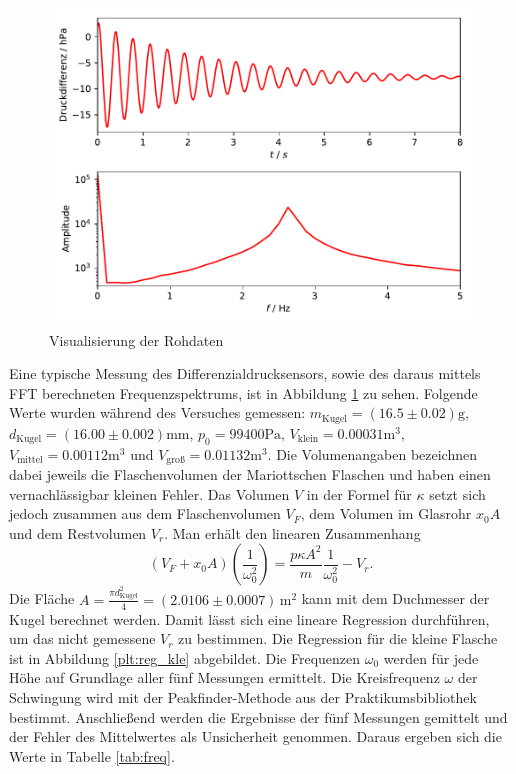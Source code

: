 \documentclass[a4paper, 12pt]{scrartcl}
\begin{document}
\begin{figure}[H]
\centering
\includegraphics[width=\textwidth]{plots/rohdaten_log.pdf}
\caption{Visualisierung der Rohdaten}
\label{rohdaten}
\end{figure}
Eine typische Messung des Differenzialdrucksensors, sowie des daraus mittels FFT berechneten Frequenzspektrums, ist in Abbildung \ref{rohdaten} zu sehen.
Folgende Werte wurden während des Versuches gemessen: $m_{\text{Kugel}} = (16.5\pm 0.02)\text{g}$, $d_{\text{Kugel}} = (16.00 \pm 0.002)\text{mm}$, $p_0 = 99400\text{Pa}$, $V_{\text{klein}} = 0.00031\text{m}^3$, $V_{\text{mittel}} = 0.00112 \text{m}^3$ und $V_{\text{groß}} = 0.01132 \text{m}^3$. Die Volumenangaben bezeichnen dabei jeweils die Flaschenvolumen der Mariottschen Flaschen und haben einen vernachlässigbar kleinen Fehler. Das Volumen $V$ in der Formel für $\kappa$ setzt sich jedoch zusammen aus dem Flaschenvolumen $V_F$, dem Volumen im Glasrohr $x_0A$ und dem Restvolumen $V_r$. Man erhält den linearen Zusammenhang
$$(V_F+x_0A)\left( \frac 1{\omega_0^2}\right) = \frac{p\kappa A^2}m \frac 1{\omega_0^2} - V_r.$$
Die Fläche $A = \frac{\pi d_{\text{Kugel}}^2}{4} = (2.0106 \pm 0.0007)\,\text{m}^2$ kann mit dem Duchmesser der Kugel berechnet werden. Damit lässt sich eine lineare Regression durchführen, um das nicht gemessene $V_r$ zu bestimmen. Die Regression für die kleine Flasche ist in Abbildung \ref{plt:reg_kle} abgebildet. Die Frequenzen $\omega_0$ werden für jede Höhe auf Grundlage aller fünf Messungen ermittelt. Die Kreisfrequenz $\omega$ der Schwingung wird mit der Peakfinder-Methode aus der Praktikumsbibliothek bestimmt. Anschließend werden die Ergebnisse der fünf Messungen gemittelt und der Fehler des Mittelwertes als Unsicherheit genommen. Daraus ergeben sich die Werte in Tabelle \ref{tab:freq}.
\end{document}

